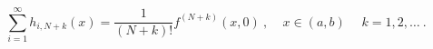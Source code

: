 \begin{equation}
\sum_{i=1}^{\infty} h_{i, N+k}(x) =
\frac{1}{(N+k)!}f^{(N+k)}(x,0)\ ,  \ \ \ \ \
x \in (a,b)\, \ \ \ \ \ k=1,2, \ldots\ .
\label{1.20}
\end{equation}

